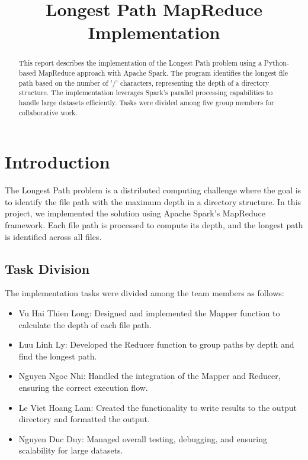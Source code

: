 \documentclass[12pt]{article}
\title{Longest Path MapReduce Implementation}
\author{}
\date{}
\begin{document}
\maketitle

\begin{abstract}
This report describes the implementation of the Longest Path problem using a Python-based MapReduce approach with Apache Spark. The program identifies the longest file path based on the number of '/' characters, representing the depth of a directory structure. The implementation leverages Spark's parallel processing capabilities to handle large datasets efficiently. Tasks were divided among five group members for collaborative work.
\end{abstract}

\section{Introduction}
The Longest Path problem is a distributed computing challenge where the goal is to identify the file path with the maximum depth in a directory structure. In this project, we implemented the solution using Apache Spark's MapReduce framework. Each file path is processed to compute its depth, and the longest path is identified across all files.

\subsection{Task Division}
The implementation tasks were divided among the team members as follows:
\begin{itemize}
    \item Vu Hai Thien Long: Designed and implemented the Mapper function to calculate the depth of each file path.
    \item Luu Linh Ly: Developed the Reducer function to group paths by depth and find the longest path.
    \item Nguyen Ngoc Nhi: Handled the integration of the Mapper and Reducer, ensuring the correct execution flow.
    \item Le Viet Hoang Lam: Created the functionality to write results to the output directory and formatted the output.
    \item Nguyen Duc Duy: Managed overall testing, debugging, and ensuring scalability for large datasets.
\end{itemize}
\end{document}
